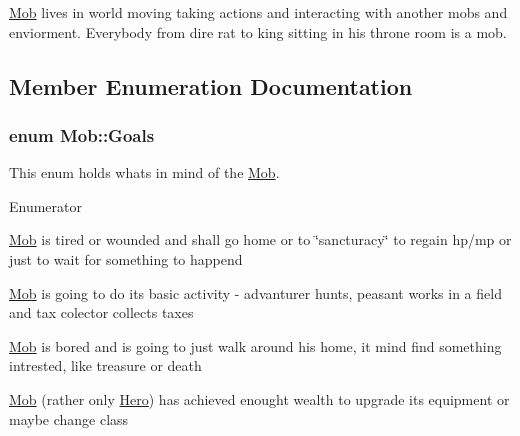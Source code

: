 \hyperlink{class_mob}{Mob} lives in world moving taking actions and interacting with another mobs and enviorment. Everybody from dire rat to king sitting in his throne room is a mob. 

\subsection{Member Enumeration Documentation}
\subsubsection[{\texorpdfstring{Goals}{Goals}}]{\setlength{\rightskip}{0pt plus 5cm}enum {\bf Mob\+::\+Goals}\hspace{0.3cm}{\ttfamily [protected]}}\hypertarget{class_mob_a886346a9f913203df0797f2c84dd8962}{}\label{class_mob_a886346a9f913203df0797f2c84dd8962}
This enum holds what\textquotesingle{}s in mind of the \hyperlink{class_mob}{Mob}. \begin{Desc}
\item[Enumerator]\par
\begin{description}
\item[{\em 
rest\hypertarget{class_mob_a886346a9f913203df0797f2c84dd8962a3d18c0a90658cc4872eed0afe28790b4}{}\label{class_mob_a886346a9f913203df0797f2c84dd8962a3d18c0a90658cc4872eed0afe28790b4}
}]\hyperlink{class_mob}{Mob} is tired or wounded and shall go home or to \char`\"{}sancturacy\char`\"{} to regain hp/mp or just to wait for something to happend \item[{\em 
grind\hypertarget{class_mob_a886346a9f913203df0797f2c84dd8962aa72b321b37507255070e236e133616f9}{}\label{class_mob_a886346a9f913203df0797f2c84dd8962aa72b321b37507255070e236e133616f9}
}]\hyperlink{class_mob}{Mob} is going to do it\textquotesingle{}s basic activity -\/ advanturer hunts, peasant works in a field and tax colector collects taxes \item[{\em 
explore\hypertarget{class_mob_a886346a9f913203df0797f2c84dd8962a114d85e85d882dd8bf2be34208450b6c}{}\label{class_mob_a886346a9f913203df0797f2c84dd8962a114d85e85d882dd8bf2be34208450b6c}
}]\hyperlink{class_mob}{Mob} is bored and is going to just walk around his home, it mind find something intrested, like treasure or death \item[{\em 
upgrade\hypertarget{class_mob_a886346a9f913203df0797f2c84dd8962ac9be3f62a039d2a4c5a63146a03a307d}{}\label{class_mob_a886346a9f913203df0797f2c84dd8962ac9be3f62a039d2a4c5a63146a03a307d}
}]\hyperlink{class_mob}{Mob} (rather only \hyperlink{class_hero}{Hero}) has achieved enought wealth to upgrade it\textquotesingle{}s equipment or maybe change class \end{description}
\end{Desc}


